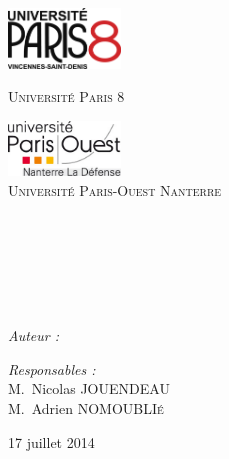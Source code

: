  

\begin{titlepage}

\begin{center}

\begin{minipage}[t]{0.48\textwidth}
  \begin{flushleft}
    \includegraphics [width=30mm]{logop8.png} \\[0.5cm]
    \begin{spacing}{1.5}
      \textsc{Université Paris 8}
    \end{spacing}
  \end{flushleft}
\end{minipage}
\begin{minipage}[t]{0.48\textwidth}
  \begin{flushright}
    \includegraphics [width=30mm]{Paris-ouest-logo.png} \\[0.5cm]
    \textsc{Université Paris-Ouest Nanterre}
  \end{flushright}
\end{minipage} \\[1.5cm]

\textsc{\Large \reportsubject}\\[0.5cm]
\HRule \\[0.4cm]
{\huge \bfseries \reporttitle}\\[0.4cm]
\HRule \\[1.5cm]

\begin{minipage}[t]{0.3\textwidth}
  \begin{flushleft} \large
    \emph{Auteur :}\\
    \reportauthor
  \end{flushleft}
\end{minipage}
\begin{minipage}[t]{0.6\textwidth}
  \begin{flushright} \large
    \emph{Responsables :} \\
    M.~Nicolas \textsc{JOUENDEAU} \\
    M.~Adrien \textsc{NOMOUBLIé}
  \end{flushright}
\end{minipage}

\vfill

{\large 17 juillet 2014}

\end{center}

\end{titlepage}
